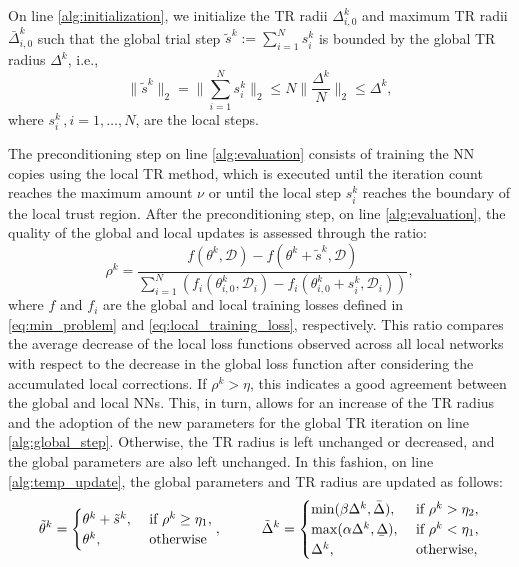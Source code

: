 \documentclass{article}
\newcommand{\ubar}[1]{\underaccent{\bar}{#1}}
\begin{document}
On line \ref{alg:initialization}, we initialize the TR radii $\Delta^k_{i,0}$ and maximum TR radii $\bar{\Delta}^{k}_{i,0}$ such that the global trial step $\tilde{s}^k := \sum_{i=1}^N s_i^k$ is bounded by the global TR radius $\Delta^k$, i.e.,
\begin{equation}
\|\tilde{s}^k\|_2 = \|\sum_{i=1}^N s_i^k\|_2 \leq N \|\frac{\Delta^k}{N}\|_2 \leq \Delta^k,
\end{equation}
where $s_i^k\,, i = 1,\ldots, N$, are the local steps.

The preconditioning step on line \ref{alg:evaluation} consists of training the NN copies using the local TR method, which is executed until the iteration count reaches the maximum amount $\nu$ or until the local step $s_i^k$ reaches the boundary of the local trust region. 
After the preconditioning step, on line \ref{alg:evaluation}, the quality of the global and local updates is assessed through the ratio:
\begin{equation}
    \rho^k = \frac{f(\theta^k, \mathcal{D}) - f(\theta^k + \tilde{s}^k, \mathcal{D})}{\sum_{i=1}^{N} (f_i(\theta^k_{i,0}, \mathcal{D}_i) - f_i(\theta^k_{i,0} + s^k_i, \mathcal{D}_i))},
    \label{eq:decrease_ratio}
\end{equation}
where $f$ and $f_i$ are the global and local training losses defined in \eqref{eq:min_problem} and \eqref{eq:local_training_loss}, respectively. 
This ratio compares the average decrease of the local loss functions observed across all local networks with respect to the decrease in the global loss function after considering the accumulated local corrections.
If $\rho^k > \eta$, this indicates a good agreement between the global and local NNs. 
This, in turn, allows for an increase of the TR radius and the adoption of the new parameters for the global TR iteration on line \ref{alg:global_step}. 
Otherwise, the TR radius is left unchanged or decreased, and the global parameters are also left unchanged. 
In this fashion, on line \ref{alg:temp_update}, the global parameters and TR radius are updated as follows:
\begin{equation}
    \tilde{\theta}^k = 
    \begin{cases}
    \theta^k + \tilde{s}^k, & \text{ if } \rho^k \geq \eta_1,\\
    \theta^k, & \text{ otherwise}
    \end{cases}
    ,
    \hspace{1cm}
    \tilde{\Delta}^k = 
    \begin{cases}
    \min(\beta \Delta^k, \bar{\Delta}), & \text{ if } \rho^k > \eta_2,\\
    \max(\alpha \Delta^k, \ubar{\Delta}), & \text{ if } \rho^k < \eta_1,\\
    \Delta^k, & \text{ otherwise},
    \end{cases}
    \label{eq:temporary_update}
\end{equation}
\end{document}

